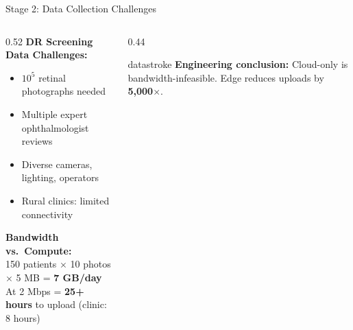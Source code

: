 \documentclass[aspectratio=169, 12pt]{beamer}
\begin{document}
\begin{frame}{Stage 2: Data Collection Challenges}
\note{
%
%
%
%
}

\footnotesize
\begin{columns}[T]
  \begin{column}{0.52\textwidth}
    \textbf{DR Screening Data Challenges:}
    \begin{itemize}\setlength\itemsep{0pt}
      \item $10^5$ retinal photographs needed
      \item Multiple expert ophthalmologist reviews
      \item Diverse cameras, lighting, operators
      \item Rural clinics: limited connectivity
    \end{itemize}

    \vspace{0.05cm}
    \textbf{Bandwidth vs.\ Compute:}\\
    {\scriptsize 150 patients $\times$ 10 photos $\times$ 5 MB = \textbf{7 GB/day}\\
    At 2 Mbps = \textbf{25+ hours} to upload (clinic: 8 hours)}
  \end{column}
  \begin{column}{0.44\textwidth}
    \begin{mlsyscard}{datastroke}
    {\scriptsize \textbf{Engineering conclusion:} Cloud-only is bandwidth-infeasible. Edge reduces uploads by \textbf{5,000$\times$}.}
    \end{mlsyscard}


\end{column}
\end{columns}
\end{frame}
\end{document}
